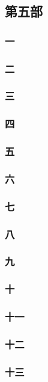 \subsection*{第五部}




\subsubsection*{一}
\subsubsection*{二}
\subsubsection*{三}
\subsubsection*{四}
\subsubsection*{五}
\subsubsection*{六}
\subsubsection*{七}
\subsubsection*{八}
\subsubsection*{九}
\subsubsection*{十}
\subsubsection*{十一}
\subsubsection*{十二}
\subsubsection*{十三}
